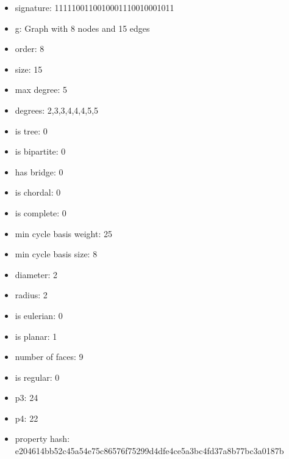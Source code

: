 \begin{itemize}
\item signature: 1111100110010001110010001011
\item g: Graph with 8 nodes and 15 edges
\item order: 8
\item size: 15
\item max degree: 5
\item degrees: 2,3,3,4,4,4,5,5
\item is tree: 0
\item is bipartite: 0
\item has bridge: 0
\item is chordal: 0
\item is complete: 0
\item min cycle basis weight: 25
\item min cycle basis size: 8
\item diameter: 2
\item radius: 2
\item is eulerian: 0
\item is planar: 1
\item number of faces: 9
\item is regular: 0
\item p3: 24
\item p4: 22
\item property hash: e204614bb52c45a54e75c86576f75299d4dfe4ce5a3bc4fd37a8b77bc3a0187b
\end{itemize}
\newpage
\begin{figure}
\end{figure}
